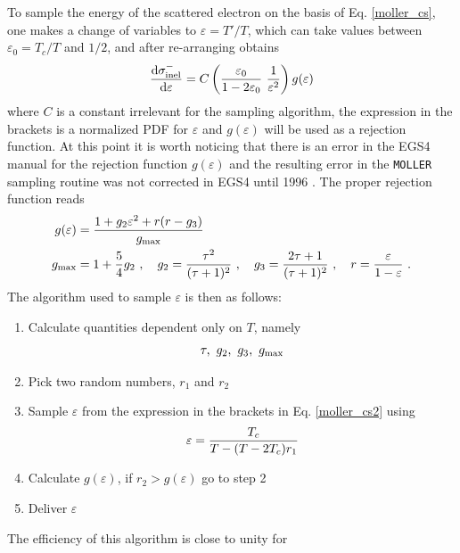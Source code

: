 To sample the energy of the scattered electron on the basis of 
Eq. \eqref{moller_cs}, one makes a change of variables to 
$\varepsilon = T'/T$, which can take values between 
$\varepsilon_0  = T_c/T$ and $1/2$, and after re-arranging 
obtains \cite{Ne85}
\begin{equation}
\label{moller_cs2}
{{\rm d} \sigma_{\rm inel}^- \over  {\rm d} \varepsilon} = 
C \left( {\varepsilon_0 \over 1 - 2 \varepsilon_0}~\frac{1}{\varepsilon^2} 
\right) g(\varepsilon) 
\end{equation}
where $C$ is a constant irrelevant for the sampling algorithm, 
the expression in the brackets is a normalized PDF for $\varepsilon$ 
and $g(\varepsilon)$ will be used as a rejection function. 
At this point it is worth noticing that there is an error in the EGS4 manual 
for the rejection function $g(\varepsilon)$ and the resulting error 
in the {\tt MOLLER} sampling routine was not 
corrected in EGS4 until 1996 \cite{Bi96b}. The proper rejection function 
reads 
\begin{equation}
\begin{split}
g(\varepsilon) &= {1 + g_2 \varepsilon^2 + r (r - g_3) \over 
g_{\rm max} } \\ g_{\rm max} &= 1 + \frac{5}{4} g_2~, \quad 
g_2 = {\tau^2 \over (\tau + 1)^2}~, \quad g_3 = {2 \tau + 1 \over (\tau+1)^2}~,
\quad r = {\varepsilon \over 1 - \varepsilon } ~.
\end{split}
\end{equation}
The algorithm used to sample $\varepsilon$ is then as follows:
\begin{enumerate}
\item
Calculate quantities dependent only on $T$, namely
\begin{displaymath}
\tau,~g_2,~g_3,~g_{\rm max} 
\end{displaymath}
\item Pick two random numbers, $r_1$ and $r_2$
\item Sample $\varepsilon$ from the expression in the brackets in 
Eq. \eqref{moller_cs2} using
\begin{equation}
\varepsilon = {T_c \over T - (T - 2 T_c) r_1}
\end{equation}
\item Calculate $g(\varepsilon)$, if $r_2 > g(\varepsilon)$  go to step 2
\item Deliver $\varepsilon$
\end{enumerate}
The efficiency of this algorithm is close to unity for 

